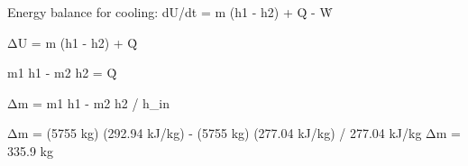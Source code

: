 Energy balance for cooling:  
dU/dt = m (h1 - h2) + Q̇ - Ẇ  

ΔU = m (h1 - h2) + Q̇  

m1 h1 - m2 h2 = Q̇  

Δm = m1 h1 - m2 h2 / h_in  

Δm = (5755 kg) (292.94 kJ/kg) - (5755 kg) (277.04 kJ/kg) / 277.04 kJ/kg  
Δm = 335.9 kg